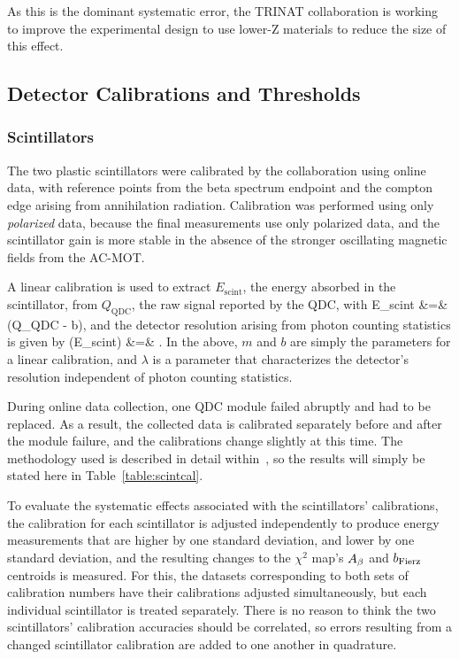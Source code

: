 As this is the dominant systematic error, the TRINAT collaboration is working to improve the experimental design to use lower-Z materials to reduce the size of this effect.




\subsection{Detector Calibrations and Thresholds}
\subsubsection{Scintillators}
The two plastic scintillators were calibrated by the collaboration using online data, with reference points from the beta spectrum endpoint and the compton edge arising from annihilation radiation.  Calibration was performed using only \emph{polarized} data, because the final measurements use only polarized data, and the scintillator gain is more stable in the absence of the stronger oscillating magnetic fields from the AC-MOT.  

A linear calibration is used to extract $E_{\textrm{scint}}$, the energy absorbed in the scintillator, from $Q_{\textrm{QDC}}$, the raw signal reported by the \ac{QDC}, with
\bea
E_{\textrm{scint}} &=& (Q_{\textrm{QDC}} - b), 
\eea
and the detector resolution arising from photon counting statistics is given by
\bea
\sigma(E_{\textrm{scint}}) &=& .
\eea
In the above, $m$ and $b$ are simply the parameters for a linear calibration, and $\lambda$ is a parameter that characterizes the detector's resolution independent of photon counting statistics.

During online data collection, one \ac{QDC} module failed abruptly and had to be replaced.  As a result, the collected data is calibrated separately before and after the module failure, and the calibrations change slightly at this time. The methodology used is described in detail within~\cite{ben_thesis}, so the results will simply be stated here in Table~\ref{table:scintcal}.


To evaluate the systematic effects associated with the scintillators' calibrations, the calibration for each scintillator is adjusted independently to produce energy measurements that are higher by one standard deviation, and lower by one standard deviation, and the resulting changes to the $\chi^2$ map's $A_{\beta}$ and $b_{\mathrm{Fierz}}$ centroids is measured.  For this, the datasets corresponding to both sets of calibration numbers have their calibrations adjusted simultaneously, but each individual scintillator is treated separately.  There is no reason to think the two scintillators' calibration accuracies should be correlated, so errors resulting from a changed scintillator calibration are added to one another in quadrature.


